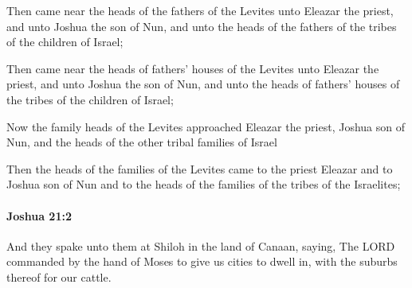 			Then came near the heads of the fathers of the Levites unto Eleazar the priest, and unto Joshua the son of Nun, and unto the heads of the fathers of the tribes of the children of Israel;

			\begin{versebox}
					\item[BHS] 
					\item[ASV] Then came near the heads of fathers' houses of the Levites unto Eleazar the priest, and unto Joshua the son of Nun, and unto the heads of fathers' houses of the tribes of the children of Israel;
					\item[NIV] Now the family heads of the Levites approached Eleazar the priest, Joshua son of Nun, and the heads of the other tribal families of Israel
					\item[NRSV] Then the heads of the families of the Levites came to the priest Eleazar and to Joshua son of Nun and to the heads of the families of the tribes of the Israelites;
			\end{versebox}

		\paragraph{Joshua 21:2} %
			\label{JOSHUA-21-2}

			And they spake unto them at Shiloh in the land of Canaan, saying, The LORD commanded by the hand of Moses to give us cities to dwell in, with the suburbs thereof for our cattle.

